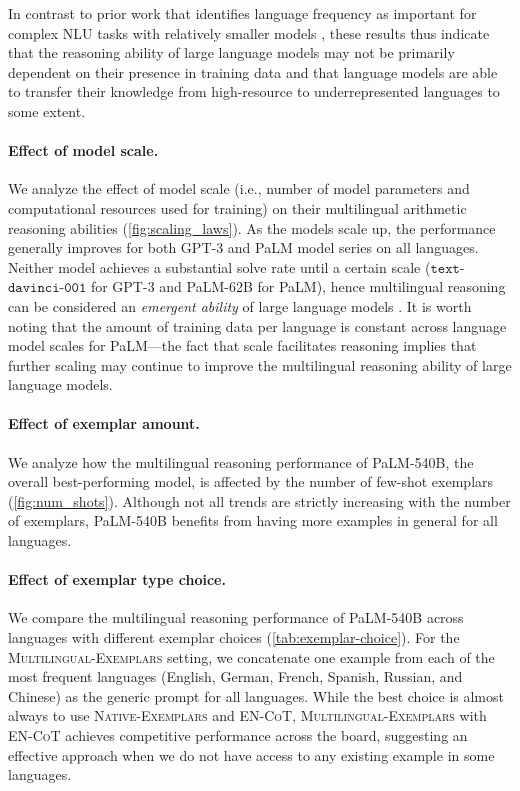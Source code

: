 In contrast to prior work that identifies language frequency as important for complex NLU tasks with relatively smaller models \citep{hu2020xtreme,Lauscher2020,ahuja-etal-2022-multi}, these results thus indicate that the reasoning ability of large language models may not be primarily dependent on their presence in training data and that language models are able to transfer their knowledge from high-resource to underrepresented languages to some extent. 

\paragraph{Effect of model scale.} We analyze the effect of model scale (i.e., number of model parameters and computational resources used for training) on their multilingual arithmetic reasoning abilities (\ref{fig:scaling_laws}). 
As the models scale up, the performance generally improves for both GPT-3 and PaLM model series on all languages. Neither model achieves a substantial solve rate until a certain scale ($\mathtt{text}$-$\mathtt{davinci}$-$\mathtt{001}$ for GPT-3 and PaLM-62B for PaLM), hence multilingual reasoning can be considered an \textit{emergent ability} of large language models \citep{wei2022emergent}. It is worth noting that the amount of training data per language is constant across language model scales for PaLM---the fact that scale facilitates reasoning implies that further scaling may continue to improve the multilingual reasoning ability of large language models.

\paragraph{Effect of exemplar amount.} We analyze how the multilingual reasoning performance of PaLM-540B, the overall best-performing model, is affected by the number of few-shot exemplars (\ref{fig:num_shots}). 
Although not all trends are strictly increasing with the number of exemplars, PaLM-540B benefits from having more examples in general for all languages.

\paragraph{Effect of exemplar type choice.} 

We compare the multilingual reasoning performance of PaLM-540B across languages with different exemplar choices (\ref{tab:exemplar-choice}). 
For the \textsc{Multilingual-Exemplars} setting, we concatenate one example from each of the most frequent languages (English, German, French, Spanish, Russian, and Chinese) as the generic prompt for all languages. While the best choice is almost always to use \textsc{Native-Exemplars} and \textsc{EN-CoT}, \textsc{Multilingual-Exemplars} with \textsc{EN-CoT} achieves competitive performance across the board, suggesting an effective approach when we do not have access to any existing example in some languages. 

